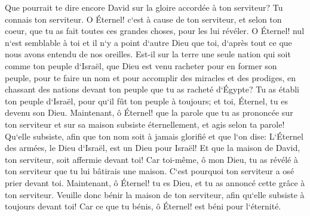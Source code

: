 \verse Que pourrait te dire encore David sur la gloire accordée à ton serviteur? Tu connais ton serviteur. 
\verse O Éternel! c`est à cause de ton serviteur, et selon ton coeur, que tu as fait toutes ces grandes choses, pour les lui révéler. 
\verse O Éternel! nul n`est semblable à toi et il n`y a point d`autre Dieu que toi, d`après tout ce que nous avons entendu de nos oreilles. 
\verse Est-il sur la terre une seule nation qui soit comme ton peuple d`Israël, que Dieu est venu racheter pour en former son peuple, pour te faire un nom et pour accomplir des miracles et des prodiges, en chassant des nations devant ton peuple que tu as racheté d`Égypte? 
\verse Tu as établi ton peuple d`Israël, pour qu`il fût ton peuple à toujours; et toi, Éternel, tu es devenu son Dieu. 
\verse Maintenant, ô Éternel! que la parole que tu as prononcée sur ton serviteur et sur sa maison subsiste éternellement, et agis selon ta parole! 
\verse Qu`elle subsiste, afin que ton nom soit à jamais glorifié et que l`on dise: L`Éternel des armées, le Dieu d`Israël, est un Dieu pour Israël! Et que la maison de David, ton serviteur, soit affermie devant toi! 
\verse Car toi-même, ô mon Dieu, tu as révélé à ton serviteur que tu lui bâtirais une maison. C`est pourquoi ton serviteur a osé prier devant toi. 
\verse Maintenant, ô Éternel! tu es Dieu, et tu as annoncé cette grâce à ton serviteur. 
\verse Veuille donc bénir la maison de ton serviteur, afin qu`elle subsiste à toujours devant toi! Car ce que tu bénis, ô Éternel! est béni pour l`éternité. 

